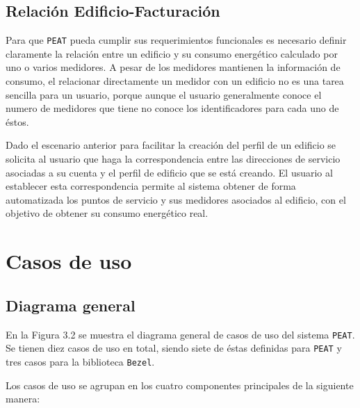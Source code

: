 \subsection{Relación Edificio-Facturación}

Para que \texttt{PEAT} pueda cumplir sus requerimientos funcionales es necesario
definir claramente la relación entre un edificio y su consumo energético calculado
por uno o varios medidores.
A pesar de los medidores mantienen la información de consumo, el relacionar
directamente un medidor con un edificio no es una tarea sencilla para un usuario,
porque aunque el usuario generalmente conoce el numero de medidores que tiene no
conoce los identificadores para cada uno de éstos.

Dado el escenario anterior para facilitar la creación del perfil de un edificio se
solicita al usuario que haga la correspondencia entre las direcciones de servicio
asociadas a su cuenta y el perfil de edificio que se está creando.
El usuario al establecer esta correspondencia permite al sistema obtener de forma
automatizada los puntos de servicio y sus medidores asociados al edificio, con el
objetivo de obtener su consumo energético real.

\section{Casos de uso}

\subsection{Diagrama general}

En la Figura 3.2 se muestra el diagrama general de casos de uso del sistema
\texttt{PEAT}. Se tienen diez casos de uso en total, siendo siete de éstas definidas
para \texttt{PEAT} y tres casos para la biblioteca \texttt{Bezel}.

Los casos de uso se agrupan en los cuatro componentes principales de la
siguiente manera:

